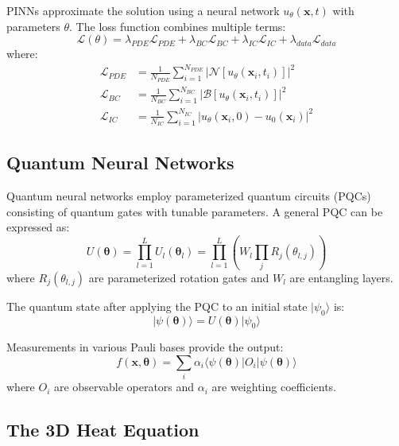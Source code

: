 \documentclass[11pt,a4paper,uplatex,dvipdfmx]{jsarticle}
\begin{document}
PINNs approximate the solution using a neural network $u_{\theta}(\mathbf{x}, t)$ with parameters $\theta$. The loss function combines multiple terms:
\begin{equation}
    \mathcal{L}(\theta) = \lambda_{PDE}\mathcal{L}_{PDE} + \lambda_{BC}\mathcal{L}_{BC} + \lambda_{IC}\mathcal{L}_{IC} + \lambda_{data}\mathcal{L}_{data}
\end{equation}
where:
\begin{align}
    \mathcal{L}_{PDE} &= \frac{1}{N_{PDE}} \sum_{i=1}^{N_{PDE}} |\mathcal{N}[u_{\theta}(\mathbf{x}_i, t_i)]|^2 \\
    \mathcal{L}_{BC} &= \frac{1}{N_{BC}} \sum_{i=1}^{N_{BC}} |\mathcal{B}[u_{\theta}(\mathbf{x}_i, t_i)]|^2 \\
    \mathcal{L}_{IC} &= \frac{1}{N_{IC}} \sum_{i=1}^{N_{IC}} |u_{\theta}(\mathbf{x}_i, 0) - u_0(\mathbf{x}_i)|^2
\end{align}

\subsection{Quantum Neural Networks}

Quantum neural networks employ parameterized quantum circuits (PQCs) consisting of quantum gates with tunable parameters. A general PQC can be expressed as:
\begin{equation}
    U(\boldsymbol{\theta}) = \prod_{l=1}^{L} U_l(\boldsymbol{\theta}_l) = \prod_{l=1}^{L} \left( W_l \prod_{j} R_j(\theta_{l,j}) \right)
\end{equation}
where $R_j(\theta_{l,j})$ are parameterized rotation gates and $W_l$ are entangling layers.

The quantum state after applying the PQC to an initial state $|\psi_0\rangle$ is:
\begin{equation}
    |\psi(\boldsymbol{\theta})\rangle = U(\boldsymbol{\theta})|\psi_0\rangle
\end{equation}

Measurements in various Pauli bases provide the output:
\begin{equation}
    f(\mathbf{x}, \boldsymbol{\theta}) = \sum_{i} \alpha_i \langle\psi(\boldsymbol{\theta})| O_i |\psi(\boldsymbol{\theta})\rangle
\end{equation}
where $O_i$ are observable operators and $\alpha_i$ are weighting coefficients.

\subsection{The 3D Heat Equation}
\end{document}
